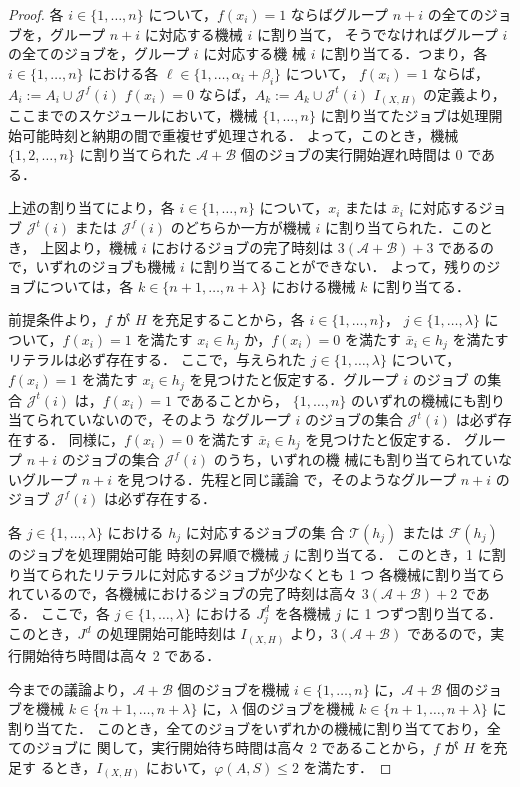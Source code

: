\documentclass[12pt]{optlab-bachelor}
\begin{document}
\begin{proof}
各 $i \in \{1,\ldots, n\}$ について，$f(x_i) = 1$ ならばグループ $n +
i$ の全てのジョブを，グループ $n + i$ に対応する機械 $i$ に割り当て，
そうでなければグループ $i$ の全てのジョブを，グループ $i$ に対応する機
械 $i$ に割り当てる．つまり，各 $i \in \{1,\ldots, n\}$ における各
$\ell \in \{1,\ldots,\alpha_i + \beta_i\}$ について，
$f(x_i) = 1$ ならば，$A_i := A_i \cup \mathcal{J}^f(i)$
$f(x_i) = 0$ ならば，$A_k := A_k \cup \mathcal{J}^t(i)$
$I_{(X,H)}$ の定義より，ここまでのスケジュールにおいて，機械
$\{1,\ldots, n\}$ に割り当てたジョブは処理開始可能時刻と納期の間で重複せず処理される．
よって，このとき，機械 $\{1,2,\ldots,n\}$ に割り当てられた
$\mathcal{A} + \mathcal{B}$ 個のジョブの実行開始遅れ時間は $0$ である．

上述の割り当てにより，各 $i \in \{1,\ldots,n\}$ について，$x_i$ または
$\bar x_i$ に対応するジョブ $\mathcal{J}^t(i)$ または
$\mathcal{J}^f(i)$ のどちらか一方が機械 $i$ に割り当てられた．このとき，
上図より，機械 $i$ におけるジョブの完了時刻は $3(\mathcal{A} +
\mathcal{B}) + 3$ であるので，いずれのジョブも機械 $i$ に割り当てることができない．
よって，残りのジョブについては，各 $k \in \{n + 1,\ldots,n +
\lambda\}$ における機械 $k$ に割り当てる．

前提条件より，$f$ が $H$ を充足することから，各 $i \in \{1,\ldots,n\}$，
$j \in \{1, \ldots, \lambda \}$ について，$f(x_i) = 1$ を満たす $x_i
\in h_j$ か，$f(x_i) = 0$ を満たす $\bar x_i \in h_j$ を満たすリテラルは必ず存在する．
ここで，与えられた $j \in \{1, \ldots, \lambda \}$ について，$f(x_i) =
1$ を満たす $x_i \in h_j$ を見つけたと仮定する．グループ $i$ のジョブ
の集合 $\mathcal{J}^t(i)$ は，$f(x_i) = 1$ であることから，
$\{1,\ldots,n\}$ のいずれの機械にも割り当てられていないので，そのよう
なグループ $i$ のジョブの集合 $\mathcal{J}^t(i)$ は必ず存在する．
同様に，$f(x_i) = 0$ を満たす $\bar x_i \in h_j$ を見つけたと仮定する．
グループ $n + i$ のジョブの集合 $\mathcal{J}^f(i)$ のうち，いずれの機
械にも割り当てられていないグループ $n + i$ を見つける．先程と同じ議論
で，そのようなグループ $n + i$ のジョブ $\mathcal{J}^f(i)$ は必ず存在する．

各 $j \in \{1, \ldots, \lambda \}$ における $h_j$ に対応するジョブの集
合 $\mathcal{T}(h_j)$ または $\mathcal{F}(h_j)$ のジョブを処理開始可能
時刻の昇順で機械 $j$ に割り当てる．
このとき，1 に割り当てられたリテラルに対応するジョブが少なくとも 1 つ
各機械に割り当てられているので，各機械におけるジョブの完了時刻は高々
$3(\mathcal{A} + \mathcal{B}) + 2$ である．
ここで，各 $j \in \{1,\ldots,\lambda\}$ における $J^d_j$ を各機械 $j$
に 1 つずつ割り当てる．
このとき，$J^d$ の処理開始可能時刻は $I_{(X,H)}$ より，$3(\mathcal{A}
+ \mathcal{B})$ であるので，実行開始待ち時間は高々 2 である．

今までの議論より，$\mathcal{A} + \mathcal{B}$ 個のジョブを機械 $i \in
\{1,\ldots,n\}$ に，$\mathcal{A} + \mathcal{B}$ 個のジョブを機械 $k \in\{n + 1, \ldots, n + \lambda\}$ に，$\lambda$ 個のジョブを機械 $k \in\{n + 1, \ldots, n + \lambda\}$ に割り当てた．
このとき，全てのジョブをいずれかの機械に割り当てており，全てのジョブに
関して，実行開始待ち時間は高々 2 であることから，$f$ が $H$ を充足す
るとき，$I_{(X,H)}$ において，$\varphi(A,S) \le 2$ を満たす．
\end{proof}
  
\end{document}
